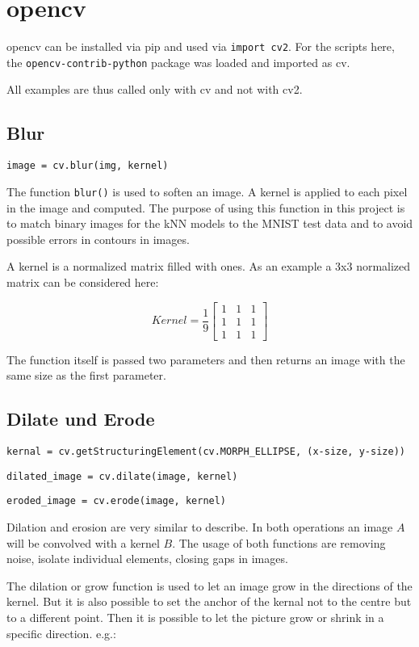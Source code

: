\author{Florian Müller}
\section {opencv}

opencv can be installed via pip and used via \texttt{import cv2}.
For the scripts here, the \texttt{opencv-contrib-python} package was loaded and imported as cv.

All examples are thus called only with cv and not with cv2.

\subsection {Blur}

\texttt{image = cv.blur(img, kernel)}

The function \texttt{blur()} is used to soften an image.
A kernel is applied to each pixel in the image and computed.
The purpose of using this function in this project is to match binary images for the kNN models to the MNIST test data and to avoid possible errors in contours in images.

A kernel is a normalized matrix filled with ones.
As an example a 3x3 normalized matrix can be considered here:

$$Kernel = \frac{1}{9}
\begin{bmatrix}
1 &1 &1 \\
1 &1 &1 \\
1 &1 &1
\end{bmatrix}
$$

The function itself is passed two parameters and then returns an image with the same size as the first parameter.

\subsection {Dilate und Erode}

\texttt{kernal = cv.getStructuringElement(cv.MORPH\_ELLIPSE, (x-size, y-size))}

\texttt{dilated\_image = cv.dilate(image, kernel)}

\texttt{eroded\_image = cv.erode(image, kernel)}

Dilation and erosion are very similar to describe.
In both operations an image $A$ will be convolved with a kernel $B$.
The usage of both functions are removing noise, isolate individual elements, closing gaps in images.

The dilation or grow function is used to let an image grow in the directions of the kernel.
But it is also possible to set the anchor of the kernal not to the centre but to a different point.
Then it is possible to let the picture grow or shrink in a specific direction.
e.g.:


